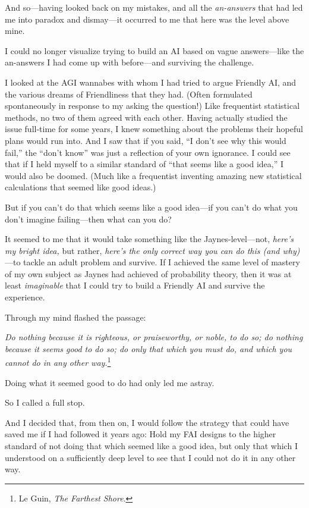 {
 And so---having looked back on my mistakes, and all the
\textit{an-answers} that had led me into paradox and dismay---it
occurred to me that here was the level above mine.}

{
 I could no longer visualize trying to build an AI based on vague
answers---like the an-answers I had come up with before---and surviving
the challenge.}

{
 I looked at the AGI wannabes with whom I had tried to argue
Friendly AI, and the various dreams of Friendliness that they had.
(Often formulated spontaneously in response to my asking the question!)
Like frequentist statistical methods, no two of them agreed with each
other. Having actually studied the issue full-time for some years, I
knew something about the problems their hopeful plans would run into.
And I saw that if you said, ``I don't
see why this would fail,'' the
``don't know'' was
just a reflection of your own ignorance. I could see that if I held
myself to a similar standard of ``that seems like a
good idea,'' I would also be doomed. (Much like a
frequentist inventing amazing new statistical calculations that seemed
like good ideas.)}

{
 But if you can't do that which seems like a good
idea---if you can't do what you don't
imagine failing---then what can you do?}

{
 It seemed to me that it would take something like the
Jaynes-level---not, \textit{here's my bright idea,} but
rather, \textit{here's the only correct way you can do
this (and why)}{}---to tackle an adult problem and survive. If I
achieved the same level of mastery of my own subject as Jaynes had
achieved of probability theory, then it was at least
\textit{imaginable} that I could try to build a Friendly AI and survive
the experience.}

{
 Through my mind flashed the passage:}

{
 \textit{Do nothing because it is righteous, or praiseworthy, or
noble, to do so; do nothing because it seems good to do so; do only
that which you must do, and which you cannot do in any other
way.}\footnote{Le Guin, \textit{The Farthest Shore}.}}

{
 Doing what it seemed good to do had only led me astray.}

{
 So I called a full stop.}

{
 And I decided that, from then on, I would follow the strategy that
could have saved me if I had followed it years ago: Hold my FAI designs
to the higher standard of not doing that which seemed like a good idea,
but only that which I understood on a sufficiently deep level to see
that I could not do it in any other way.}

